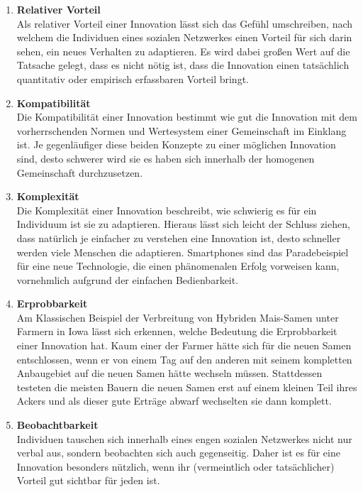 \documentclass[12pt]{article}
\begin{document}
\begin{enumerate}
\item \textbf{Relativer Vorteil}\\ Als relativer Vorteil einer Innovation lässt sich das Gefühl umschreiben, nach welchem die Individuen eines sozialen Netzwerkes einen Vorteil für sich darin sehen, ein neues Verhalten zu adaptieren. Es wird dabei großen Wert auf die Tatsache gelegt, dass es nicht nötig ist, dass die Innovation einen tatsächlich quantitativ oder empirisch erfassbaren Vorteil bringt.
\item \textbf{Kompatibilität}\\ Die Kompatibilität einer Innovation bestimmt wie gut die Innovation mit dem vorherrschenden Normen und Wertesystem einer Gemeinschaft im Einklang ist. Je gegenläufiger diese beiden Konzepte zu einer möglichen Innovation sind, desto schwerer wird sie es haben sich innerhalb der homogenen Gemeinschaft durchzusetzen.
\item \textbf{Komplexität}\\ Die Komplexität einer Innovation beschreibt, wie schwierig es für ein Individuum ist sie zu adaptieren. Hieraus lässt sich leicht der Schluss ziehen, dass natürlich je einfacher zu verstehen eine Innovation ist, desto schneller werden viele Menschen die adaptieren. Smartphones sind das Paradebeispiel für eine neue Technologie, die einen phänomenalen Erfolg vorweisen kann, vornehmlich aufgrund der einfachen Bedienbarkeit.
\item \textbf{Erprobbarkeit} \\ Am Klassischen Beispiel der Verbreitung von Hybriden Mais-Samen unter Farmern in Iowa lässt sich erkennen, welche Bedeutung die Erprobbarkeit einer Innovation hat. Kaum einer der Farmer hätte sich für die neuen Samen entschlossen, wenn er von einem Tag auf den anderen mit seinem kompletten Anbaugebiet auf die neuen Samen hätte wechseln müssen. Stattdessen testeten die meisten Bauern die neuen Samen erst auf einem kleinen Teil ihres Ackers und als dieser gute Erträge abwarf wechselten sie dann komplett.
\item \textbf{Beobachtbarkeit} \\ Individuen tauschen sich innerhalb eines engen sozialen Netzwerkes nicht nur verbal aus, sondern beobachten sich auch gegenseitig. Daher ist es für eine Innovation besonders nützlich, wenn ihr (vermeintlich oder tatsächlicher) Vorteil gut sichtbar für jeden ist.
\end{enumerate}
\end{document}
